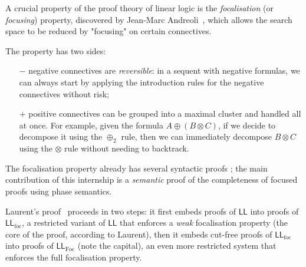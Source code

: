 \documentclass[11pt]{article}
\newcommand\LL{\textsf{LL}}
\newcommand\0{\textbf{0}}
\newcommand\1{\textbf{1}}
\newcommand\LLfoc{{\LL_\text{foc}}}
\newcommand\LLFoc{{\LL_\text{Foc}}}
\begin{document}
A crucial property of the proof theory of linear logic is the \emph{focalisation} (or \emph{focusing}) property,
discovered by Jean-Marc Andreoli~\cite{andreoli}, which allows the search space to be reduced by "focusing" on certain
connectives.

The property has two sides:
\begin{itemize}
    \item[$-$] negative connectives are \emph{reversible}: in a sequent with negative formulas,
    we can always start by applying the introduction rules for the negative connectives without risk;
    \item[$+$] positive connectives can be grouped into a maximal cluster and handled all at once.
    For example, given the formula $A \oplus (B \otimes C)$, if we decide to decompose it using the $\oplus_2$ rule,
    then we can immediately decompose $B \otimes C$ using the $\otimes$ rule without needing to backtrack.
\end{itemize}

The focalisation property already has several syntactic proofs \cite{andreoli} \cite{saurin} \cite{laurent}; the main
contribution of this internship is a \emph{semantic} proof of the completeness of focused proofs
using phase semantics.

Laurent's proof~\cite{laurent} proceeds in two steps: it first embeds proofs of $\LL$ into proofs of $\LLfoc$, a
restricted variant of $\LL$ that enforces a \emph{weak} focalisation property (the core of the proof, according to Laurent),
then it embeds cut-free proofs of $\LLfoc$ into proofs of $\LLFoc$ (note the capital), an even more restricted system that enforces
the full focalisation property.
\end{document}
